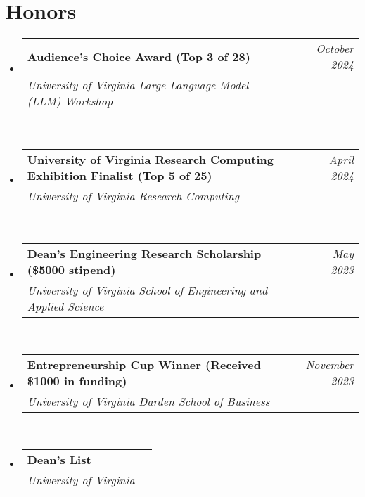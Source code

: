 \documentclass[letterpaper,11pt]{article}
\makeatletter
\newcommand{\Date}[1]{\textit{\small #1}}
\newcommand{\resumeSubheading}[4]{
  \item
    \begin{tabular*}{0.9798\textwidth}{l@{\extracolsep{\fill}}r} %
      \textbf{#1} & #2 \\
      \textit{\small#3} & \Date{#4} \\
    \end{tabular*}\
}
\makeatother
\begin{document}
\section{Honors}
\begin{itemize}
  \resumeSubheading{Audience's Choice Award \textnormal{(Top 3 of 28)}}{\Date{October 2024}}{University of Virginia Large Language Model (LLM) Workshop}{} \\
  \resumeSubheading{University of Virginia Research Computing Exhibition Finalist \textnormal{(Top 5 of 25)}}{\Date{April 2024}}{University of Virginia Research Computing}{} \\
  \resumeSubheading{Dean's Engineering Research Scholarship \textnormal{(\$5000 stipend)}}{\Date{May 2023}}{University of Virginia School of Engineering and Applied Science}{} \\
  \resumeSubheading{Entrepreneurship Cup Winner \textnormal{(Received \$1000 in funding)}}{\Date{November 2023}}{University of Virginia Darden School of Business}{} \\
  \resumeSubheading{Dean's List}{}{University of Virginia}{}
\end{itemize}
\end{document}
